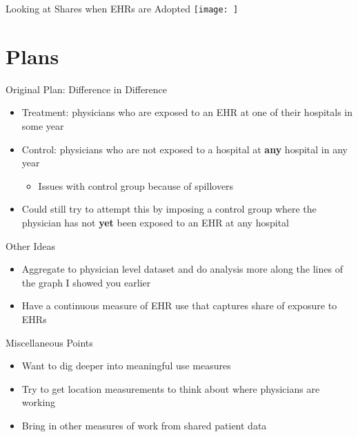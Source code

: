 \documentclass[10pt]{beamer}
\begin{document}
\begin{frame}{Looking at Shares when EHRs are Adopted}
    \centering
    \texttt{[image: ]}
\end{frame}





\section{Plans}

\begin{frame}{Original Plan: Difference in Difference}
\begin{itemize}
    \item Treatment: physicians who are exposed to an EHR at one of their hospitals in some year
    \item Control: physicians who are not exposed to a hospital at \textbf{any} hospital in any year
    \begin{itemize}
        \item  Issues with control group because of spillovers
    \end{itemize}
    \item Could still try to attempt this by imposing a control group where the physician has not \textbf{yet} been exposed to an EHR at any hospital
\end{itemize}
\end{frame}

\begin{frame}{Other Ideas}
\begin{itemize}
    \item Aggregate to physician level dataset and do analysis more along the lines of the graph I showed you earlier
    \item Have a continuous measure of EHR use that captures share of exposure to EHRs
\end{itemize}
\end{frame}

\begin{frame}{Miscellaneous Points}
\begin{itemize}
    \item Want to dig deeper into meaningful use measures
    \item Try to get location measurements to think about where physicians are working
    \item Bring in other measures of work from shared patient data
\end{itemize}
    
\end{frame}
\end{document}
